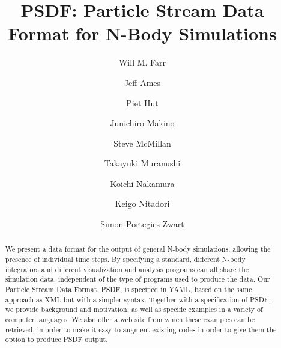 \documentclass[5p,authoryear]{elsarticle}
\begin{document}
\title{PSDF: Particle Stream Data Format for N-Body Simulations}

\author[WMF]{Will M. Farr}
\author[PH]{Jeff Ames}
\author[PH]{Piet Hut}
\author[JM]{Junichiro Makino}
\author[SM]{Steve McMillan}
\author[TM]{Takayuki Muranushi}
\author[KN]{Koichi Nakamura}
\author[KN2]{Keigo Nitadori}
\author[SPZ]{Simon Portegies Zwart}


\address[WMF]{Northwestern University Center for Interdisciplinary
  Research in Astrophysics, 2145 Sheridan Rd., Evanston IL 60208 USA}

\address[PH]{Institute for Advanced Study, Princeton, NJ 08540, USA}

\address[JM]{Interactive Research Center of Science, Graduate
  School of Science and Engineering Tokyo Institute of Technology,
  2--12--1 Ookayama, Meguro, Tokyo 152-8551, Japan}

\address[SM]{Department of Physics, Drexel University, 3141 Chestnut
  Street, Philadelphia, PA 19104}

\address[TM]{The Hakubi Center, Kyoto University, Kitashirakawa Oiwakecho,
Sakyo-Ku, Kyoto, 606-8502, Japan}

\address[KN]{Graduate School of Information Science and Technology,
  The University of Tokyo.  7-3-1 Hongo, Bunkyo-ku, Tokyo, Japan}

\address[KN2]{Center for Computational Science, University of Tsukuba,
  1–1–1, Tennodai, Tsukuba, Ibaraki 305–8577, Japan}

\address[SPZ]{Leiden University, P.O. Box 9513, 2300 RA Leiden, The
  Netherlands}

\begin{abstract}
  We present a data format for the output of general N-body
  simulations, allowing the presence of individual time steps.  By
  specifying a standard, different N-body integrators and different
  visualization and analysis programs can all share the simulation
  data, independent of the type of programs used to produce the data.
  Our Particle Stream Data Format, PSDF, is specified in YAML, based
  on the same approach as XML but with a simpler syntax.  Together
  with a specification of PSDF, we provide background and motivation,
  as well as specific examples in a variety of computer languages.  We
  also offer a web site from which these examples can be retrieved, in
  order to make it easy to augment existing codes in order to give
  them the option to produce PSDF output.
\end{abstract}
\end{document}
